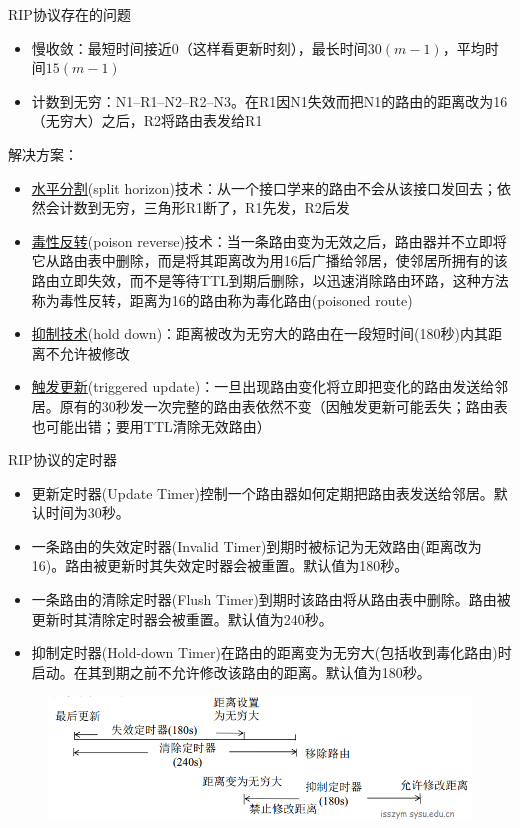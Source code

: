 \myhline
RIP协议存在的问题
\begin{itemize}
	\item 慢收敛：最短时间接近$0$（这样看更新时刻），最长时间$30(m-1)$，平均时间$15(m-1)$
	\item 计数到无穷：N1--R1--N2--R2--N3。在R1因N1失效而把N1的路由的距离改为16（无穷大）之后，R2将路由表发给R1
\end{itemize}

解决方案：
\begin{itemize}
	\item \underline{水平分割}(split horizon)技术：从一个接口学来的路由不会从该接口发回去；依然会计数到无穷，三角形R1断了，R1先发，R2后发
	\item \underline{毒性反转}(poison reverse)技术：当一条路由变为无效之后，路由器并不立即将它从路由表中删除，而是将其距离改为用16后广播给邻居，使邻居所拥有的该路由立即失效，而不是等待TTL到期后删除，以迅速消除路由环路，这种方法称为毒性反转，距离为16的路由称为毒化路由(poisoned route)
	\item \underline{抑制技术}(hold down)：距离被改为无穷大的路由在一段短时间(180秒)内其距离不允许被修改
	\item \underline{触发更新}(triggered update)：一旦出现路由变化将立即把变化的路由发送给邻居。原有的30秒发一次完整的路由表依然不变（因触发更新可能丢失；路由表也可能出错；要用TTL清除无效路由）
\end{itemize}

\myhline
RIP协议的定时器
\begin{itemize}
\item 更新定时器(Update Timer)控制一个路由器如何定期把路由表发送给邻居。默认时间为30秒。
\item 一条路由的失效定时器(Invalid Timer)到期时被标记为无效路由(距离改为16)。路由被更新时其失效定时器会被重置。默认值为180秒。
\item 一条路由的清除定时器(Flush Timer)到期时该路由将从路由表中删除。路由被更新时其清除定时器会被重置。默认值为240秒。
\item 抑制定时器(Hold-down Timer)在路由的距离变为无穷大(包括收到毒化路由)时启动。在其到期之前不允许修改该路由的距离。默认值为180秒。
\end{itemize}
\begin{figure}[H]
	\centering
	\includegraphics[width=0.7\linewidth]{fig/rip_timer.png}
\end{figure}

